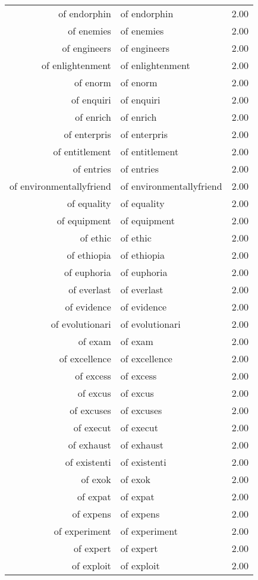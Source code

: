 \begin{table}[ht]
\begin{tabular}{rlr}
  of endorphin & of endorphin & 2.00 \\ 
  of enemies & of enemies & 2.00 \\ 
  of engineers & of engineers & 2.00 \\ 
  of enlightenment & of enlightenment & 2.00 \\ 
  of enorm & of enorm & 2.00 \\ 
  of enquiri & of enquiri & 2.00 \\ 
  of enrich & of enrich & 2.00 \\ 
  of enterpris & of enterpris & 2.00 \\ 
  of entitlement & of entitlement & 2.00 \\ 
  of entries & of entries & 2.00 \\ 
  of environmentallyfriend & of environmentallyfriend & 2.00 \\ 
  of equality & of equality & 2.00 \\ 
  of equipment & of equipment & 2.00 \\ 
  of ethic & of ethic & 2.00 \\ 
  of ethiopia & of ethiopia & 2.00 \\ 
  of euphoria & of euphoria & 2.00 \\ 
  of everlast & of everlast & 2.00 \\ 
  of evidence & of evidence & 2.00 \\ 
  of evolutionari & of evolutionari & 2.00 \\ 
  of exam & of exam & 2.00 \\ 
  of excellence & of excellence & 2.00 \\ 
  of excess & of excess & 2.00 \\ 
  of excus & of excus & 2.00 \\ 
  of excuses & of excuses & 2.00 \\ 
  of execut & of execut & 2.00 \\ 
  of exhaust & of exhaust & 2.00 \\ 
  of existenti & of existenti & 2.00 \\ 
  of exok & of exok & 2.00 \\ 
  of expat & of expat & 2.00 \\ 
  of expens & of expens & 2.00 \\ 
  of experiment & of experiment & 2.00 \\ 
  of expert & of expert & 2.00 \\ 
  of exploit & of exploit & 2.00 \\ 

\end{tabular}
\end{table}
